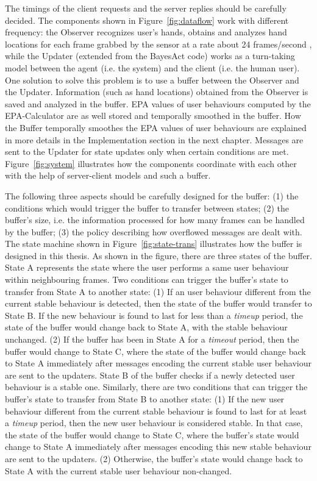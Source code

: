 The timings of the client requests and the server replies should be carefully decided. The components shown in Figure~\ref{fig:dataflow} work with different frequency: the Observer recognizes user's hands, obtains and analyzes hand locations for each frame grabbed by the sensor at a rate about 24 frames/second , while the Updater (extended from the BayesAct code) works as a turn-taking model between the agent (i.e. the system) and the client (i.e. the human user). One solution to solve this problem is to use a buffer between the Observer and the Updater. Information (such as hand locations) obtained from the Observer is saved and analyzed in the buffer. EPA values of user behaviours computed by the EPA-Calculator are as well stored and temporally smoothed in the buffer. How the Buffer temporally smoothes the EPA values of user behaviours are explained in more details in the Implementation section in the next chapter. Messages are sent to the Updater for state updates only when certain conditions are met. Figure~\ref{fig:system} illustrates how the components coordinate with each other with the help of server-client models and such a buffer.

The following three aspects should be carefully designed for the buffer: (1) the conditions which would trigger the buffer to transfer between states; (2) the buffer's size, i.e. the information processed for how many frames can be handled by the buffer; (3) the policy describing how overflowed messages are dealt with. The state machine shown in Figure~\ref{fig:state-trans} illustrates how the buffer is designed in this thesis. As shown in the figure, there are three states of the buffer. State A represents the state where the user performs a same user behaviour within neighbouring frames. Two conditions can trigger the buffer's state to transfer from State A to another state: (1) If an user behaviour different from the current stable behaviour is detected, then the state of the buffer would transfer to State B. If the new behaviour is found to last for less than a \textit{timeup} period, the state of the buffer would change back to State A, with the stable behaviour unchanged. (2) If the buffer has been in State A for a \textit{timeout} period, then the buffer would change to State C, where the state of the buffer would change back to State A immediately after messages encoding the current stable user behaviour are sent to the updaters. State B of the buffer checks if a newly detected user behaviour is a stable one. Similarly, there are two conditions that can trigger the buffer's state to transfer from State B to another state: (1) If the new user behaviour different from the current stable behaviour is found to last for at least a \textit{timeup} period, then the new user behaviour is considered stable. In that case, the state of the buffer would change to State C, where the buffer's state would change to State A immediately after messages encoding this new stable behaviour are sent to the updaters. (2) Otherwise, the buffer's state would change back to State A with the current stable user behaviour non-changed.

